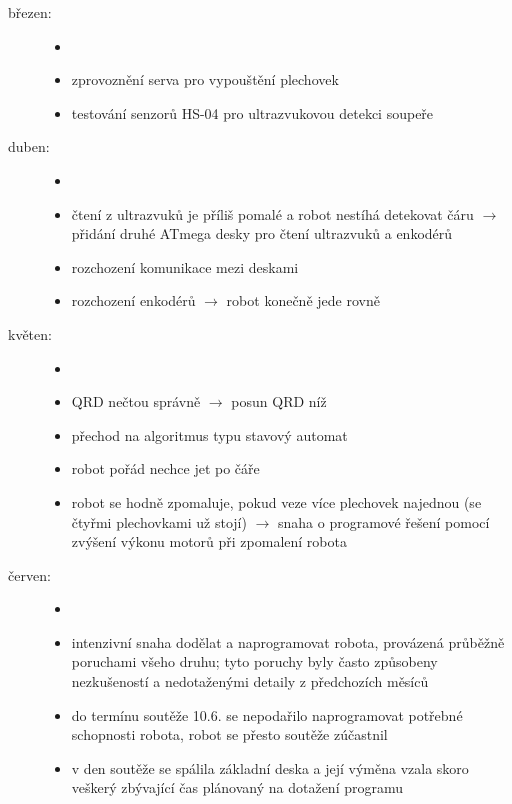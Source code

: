\begin{description}
	\item[březen:] 
	\begin{itemize}
		\item[]
		\item zprovoznění serva pro vypouštění plechovek
		\item testování senzorů HS-04 pro ultrazvukovou detekci soupeře 
	\end{itemize}  
	
	\item[duben:] 
	\begin{itemize}
		\item[]
		\item čtení z ultrazvuků je příliš pomalé a robot nestíhá detekovat čáru $\rightarrow$
		přidání druhé ATmega desky pro čtení ultrazvuků a enkodérů
		\item rozchození komunikace mezi deskami 
		\item rozchození enkodérů $\rightarrow$ robot konečně jede rovně 
	\end{itemize}  
	
	\item[květen:] 
	\begin{itemize}
		\item[]
		\item QRD nečtou správně $\rightarrow$ posun QRD níž
		\item přechod na algoritmus typu stavový automat
		\item robot pořád nechce jet po čáře
		\item robot  se hodně zpomaluje, pokud veze více plechovek najednou (se čtyřmi plechovkami už stojí) $\rightarrow$ snaha o programové řešení pomocí zvýšení výkonu motorů při zpomalení robota
	\end{itemize}
	
	
	\item[červen:] 
	\begin{itemize}
		\item[]
		\item intenzivní snaha dodělat a naprogramovat robota, provázená průběžně poruchami všeho druhu;
		tyto poruchy byly často způsobeny nezkušeností a nedotaženými detaily z předchozích měsíců  
		\item do termínu soutěže 10.6. se nepodařilo naprogramovat potřebné schopnosti robota, robot se přesto soutěže zúčastnil
		\item v den soutěže se spálila základní deska a její výměna vzala skoro veškerý zbývající čas plánovaný na dotažení programu  
	\end{itemize} 
\end{description}
	\vspace{1cm}

